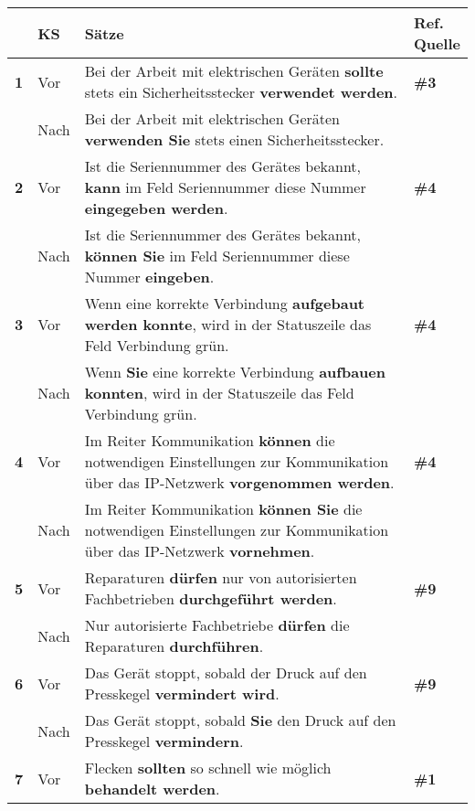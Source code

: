 \begin{longtable}{llp{}l}

\lsptoprule
{} & \textbf{KS} & \textbf{Sätze} & \makecell[tl]{\textbf{Ref.}\\\textbf{Quelle}}\\
\midrule
{ \textbf{1}} & Vor & Bei der Arbeit mit elektrischen Geräten \textbf{sollte} stets ein Sicherheitsstecker \textbf{verwendet werden}. & \textbf{\#3}\\
& Nach & Bei der Arbeit mit elektrischen Geräten \textbf{verwenden Sie} stets einen Sicherheitsstecker. & \\
\tablevspace
{ \textbf{2}} & Vor & Ist die Seriennummer des Gerätes bekannt, \textbf{kann} im Feld Seriennummer diese Nummer \textbf{eingegeben werden}. & \textbf{\#4}\\
& Nach & Ist die Seriennummer des Gerätes bekannt, \textbf{können Sie} im Feld Seriennummer diese Nummer \textbf{eingeben}. & \\
\tablevspace
{ \textbf{3}} & Vor & Wenn eine korrekte Verbindung \textbf{aufgebaut werden konnte}, wird in der Statuszeile das Feld Verbindung grün. & \textbf{\#4}\\
& Nach & Wenn \textbf{Sie} eine korrekte Verbindung \textbf{aufbauen konnten}, wird in der Statuszeile das Feld Verbindung grün. & \\
\tablevspace
{ \textbf{4}} & Vor & Im Reiter Kommunikation \textbf{können} die notwendigen Einstellungen zur Kommunikation über das IP-Netzwerk \textbf{vorgenommen werden}. & \textbf{\#4}\\
& Nach & Im Reiter Kommunikation \textbf{können Sie} die notwendigen Einstellungen zur Kommunikation über das IP-Netzwerk \textbf{vornehmen}. & \\
\tablevspace
{ \textbf{5}} & Vor & Reparaturen \textbf{dürfen} nur von autorisierten Fachbetrieben \textbf{durchgeführt werden}. & \textbf{\#9}\\
& Nach & Nur autorisierte Fachbetriebe \textbf{dürfen} die Reparaturen \textbf{durchführen}. & \\
\tablevspace
{ \textbf{6}} & Vor & Das Gerät stoppt, sobald der Druck auf den Presskegel \textbf{vermindert wird}. & \textbf{\#9}\\
& Nach & Das Gerät stoppt, sobald \textbf{Sie} den Druck auf den Presskegel \textbf{vermindern}. & \\
\tablevspace
{ \textbf{7}} & Vor & Flecken \textbf{sollten} so schnell wie möglich \textbf{behandelt werden}. & \textbf{\#1}\\

\end{longtable}
